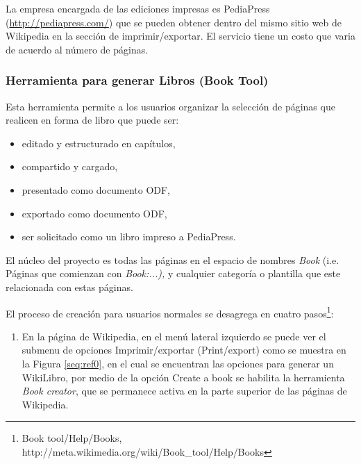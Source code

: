\documentclass[letterpaper]{article}
\newcommand\liststyleLxx{%
\renewcommand\labelitemi{{\textbullet}}
\renewcommand\labelitemii{${\circ}$}
\renewcommand\labelitemiii{${\blacksquare}$}
\renewcommand\labelitemiv{{\textbullet}}
}
\newcommand\liststyleLxxi{%
\renewcommand\theenumi{\arabic{enumi}}
\renewcommand\theenumii{\arabic{enumii}}
\renewcommand\theenumiii{\arabic{enumiii}}
\renewcommand\theenumiv{\arabic{enumiv}}
\renewcommand\labelenumi{\theenumi.}
\renewcommand\labelenumii{\theenumii.}
\renewcommand\labelenumiii{\theenumiii.}
\renewcommand\labelenumiv{\theenumiv.}
}
\newcounter{Figura}
\begin{document}
{\sffamily
\foreignlanguage{spanish}{La }empresa encargada de las ediciones
impresas es PediaPress (\url{http://pediapress.com/}) que se pueden
obtener dentro del mismo sitio web de Wikipedia en la secci\'on de
imprimir/exportar. El servicio tiene un costo que varia de acuerdo al
n\'umero de p\'aginas.}


\bigskip

\subsubsection[Herramienta para generar Libros (Book Tool)]{Herramienta
para generar Libros (Book Tool)\footnotemark{}}
\hypertarget{RefHeading10812782078703}{}
{\sffamily
Esta herramienta permite a los usuarios organizar la selecci\'on de
p\'aginas que realicen en forma de libro que puede ser:}


\bigskip

\liststyleLxx
\begin{itemize}
\item {\sffamily
editado y estructurado en cap\'itulos,}
\item {\sffamily
compartido y cargado,}
\item {\sffamily
presentado como documento ODF,}
\item {\sffamily
exportado como documento ODF,}
\item {\sffamily
ser solicitado como un libro impreso a PediaPress.}
\end{itemize}

\bigskip

{\sffamily
El n\'ucleo del proyecto es todas las p\'aginas en el espacio de nombres
\textit{Book} (i.e. P\'aginas que comienzan con \textit{Book:...), }y
cualquier categor\'ia o plantilla que este relacionada con estas
p\'aginas. }

{\sffamily
El proceso de creaci\'on para usuarios normales se desagrega en cuatro
pasos\footnote{Book tool/Help/Books,
http://meta.wikimedia.org/wiki/Book\_tool/Help/Books}:}


\bigskip

\liststyleLxxi
\begin{enumerate}
\item {\sffamily
En la p\'agina de Wikipedia, en el men\'u lateral izquierdo se puede ver
el submenu de opciones Imprimir/exportar (Print/export) como se muestra
en la Figura \ref{seq:ref0}, en el cual se encuentran las opciones para
generar un WikiLibro, por medio de la opci\'on Create a book se
habilita la herramienta \textit{Book creator}, que se permanece activa
en la parte superior de las p\'aginas de Wikipedia. }
\end{enumerate}
\end{document}
